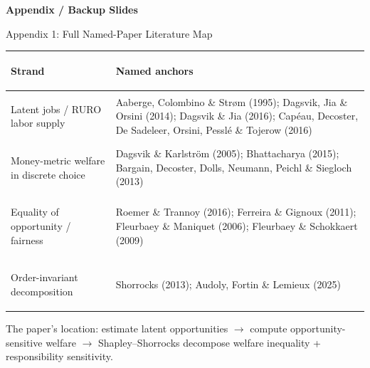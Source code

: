 \documentclass[aspectratio=169,11pt]{beamer}
\begin{document}
\appendix

\begin{frame}[plain]
\vfill
\begin{center}
\Large\bfseries Appendix / Backup Slides
\end{center}
\vfill
\end{frame}

\begin{frame}{Appendix 1: Full Named-Paper Literature Map}

\scriptsize
\begin{tabular}{@{}>{\bfseries\raggedright}p{2.8cm} p{8.5cm}@{}}
\toprule
\textbf{Strand} & \textbf{Named anchors} \\
\midrule
Latent jobs / RURO labor supply
& Aaberge, Colombino \& Str\o m (1995); Dagsvik, Jia \& Orsini (2014); Dagsvik \& Jia (2016); Cap\'eau, Decoster, De Sadeleer, Orsini, Pessl\'e \& Tojerow (2016) \\[4pt]
Money-metric welfare in discrete choice
& Dagsvik \& Karlstr\"om (2005); Bhattacharya (2015); Bargain, Decoster, Dolls, Neumann, Peichl \& Siegloch (2013) \\[4pt]
Equality of opportunity / fairness
& Roemer \& Trannoy (2016); Ferreira \& Gignoux (2011); Fleurbaey \& Maniquet (2006); Fleurbaey \& Schokkaert (2009) \\[4pt]
Order-invariant decomposition
& Shorrocks (2013); Audoly, Fortin \& Lemieux (2025) \\
\bottomrule
\end{tabular}

\bigskip
\centering
\scriptsize\textcolor{cgrey}{The paper's location: estimate latent opportunities $\rightarrow$ compute opportunity-sensitive welfare $\rightarrow$ Shapley--Shorrocks decompose welfare inequality + responsibility sensitivity.}
\end{frame}
\end{document}
